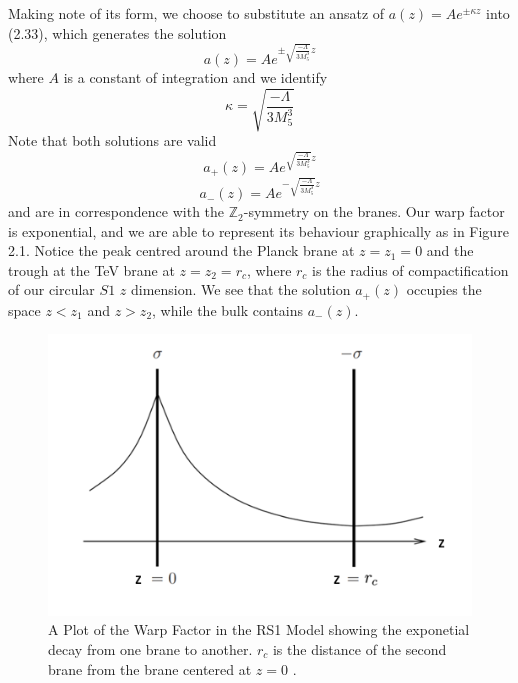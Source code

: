 \documentclass[11pt]{report}
\numberwithin{equation}{chapter}
\begin{document}
Making note of its form, we choose to substitute an ansatz of $a(z)=Ae^{\pm\kappa z}$ into (2.33), which generates the solution
\begin{equation}
    a(z)=Ae^{\pm\sqrt{\frac{-\Lambda}{3M^3_5}}z}
\end{equation}
where $A$ is a constant of integration and we identify
\begin{equation}
    \kappa = \sqrt{\frac{-\Lambda}{3M^3_5}}
\end{equation}
Note that both solutions are valid 
\begin{equation}
    a_+(z)=Ae^{\sqrt{\frac{-\Lambda}{3M^3_5}}z}
\end{equation}
\begin{equation}
    a_-(z)=Ae^{-\sqrt{\frac{-\Lambda}{3M^3_5}}z}
\end{equation}
and are in correspondence with the $\mathbb{Z}_2$-symmetry on the branes. Our warp factor is exponential, and we are able to represent its behaviour graphically as in Figure 2.1. Notice the peak centred around the Planck brane at $z=z_1=0$ and the trough at the TeV brane at $z=z_2=r_c$, where $r_c$ is the radius of compactification of our circular $S1$ $z$ dimension. We see that the solution $a_+(z)$ occupies the space $z<z_1$ and $z>z_2$, while the bulk contains $a_-(z)$. 
\begin{figure}[h]
\centering
    \includegraphics[scale=0.6]{Images/RS1 warp factor.png}
    \caption{A Plot of the Warp Factor in the RS1 Model showing the exponetial decay from one brane to another. $r_c$ is the distance of the second brane from the brane centered at $z=0$ \cite{Figures}.}
    \label{fig:RS1}
\end{figure}\\
\end{document}

